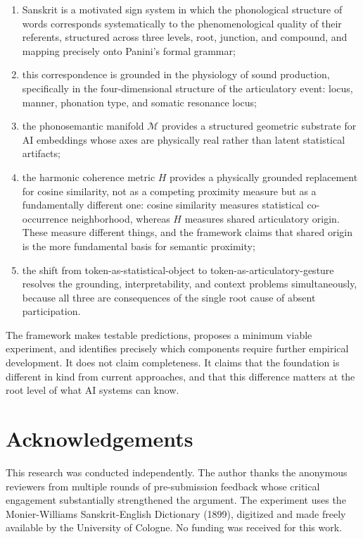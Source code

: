 \documentclass[12pt]{article}
\begin{document}
\begin{enumerate}
  \item Sanskrit is a motivated sign system in which the phonological structure of words corresponds systematically to the phenomenological quality of their referents, structured across three levels, root, junction, and compound, and mapping precisely onto Panini's formal grammar;
  \item this correspondence is grounded in the physiology of sound production, specifically in the four-dimensional structure of the articulatory event: locus, manner, phonation type, and somatic resonance locus;
  \item the phonosemantic manifold $\mathcal{M}$ provides a structured geometric substrate for AI embeddings whose axes are physically real rather than latent statistical artifacts;
  \item the harmonic coherence metric $H$ provides a physically grounded replacement for cosine similarity, not as a competing proximity measure but as a fundamentally different one: cosine similarity measures statistical co-occurrence neighborhood, whereas $H$ measures shared articulatory origin. These measure different things, and the framework claims that shared origin is the more fundamental basis for semantic proximity;
  \item the shift from token-as-statistical-object to token-as-articulatory-gesture resolves the grounding, interpretability, and context problems simultaneously, because all three are consequences of the single root cause of absent participation.
\end{enumerate}

The framework makes testable predictions, proposes a minimum viable experiment, and identifies precisely which components require further empirical development. It does not claim completeness. It claims that the foundation is different in kind from current approaches, and that this difference matters at the root level of what AI systems can know.


\section*{Acknowledgements}

This research was conducted independently. The author thanks the anonymous reviewers from multiple rounds of pre-submission feedback whose critical engagement substantially strengthened the argument. The experiment uses the Monier-Williams Sanskrit-English Dictionary (1899), digitized and made freely available by the University of Cologne. No funding was received for this work.
\end{document}
